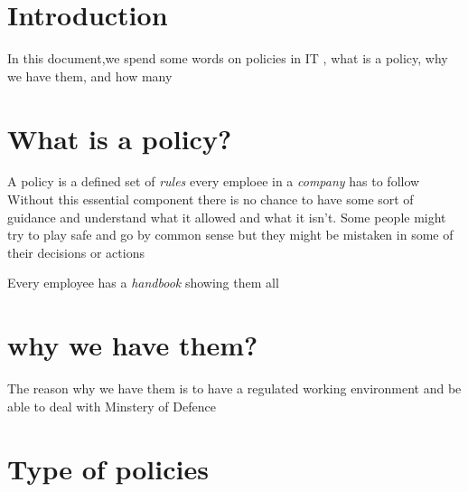 \documentclass[a4paper,12pt]{article}
\begin{document}
\tableofcontents

\section{Introduction}
In this document,we spend some words on policies in IT , what is a policy, why we have them, and how many 

\clearpage

\section{What is a policy?}
A policy is a defined set of \emph{rules} every emploee in a \emph{company} has to follow
Without this essential component there is no chance to have some sort of guidance and understand what it allowed and what it isn't. Some people might try to play safe and go by common sense but they might be mistaken in some of their decisions or actions

Every employee has a \emph{handbook} showing them all

\section{why we have them?}

The reason why we have them is to have a regulated working environment and be able to deal with Minstery of Defence 

\section{Type of policies}
\clearpage
\printindex
\end{document}
